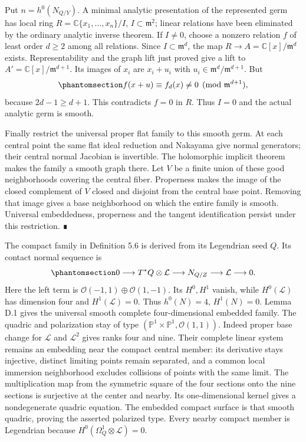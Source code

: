 \documentclass[
  english,
  11pt,
  reqno]{amsart}
\begin{document}
Put \(n=h^0(N_{Q/Y})\). A minimal analytic presentation of the
represented germ has local ring \(R=\mathbb C\{x_1,\ldots,x_n\}/I\),
\(I\subset\mathfrak m^2\); linear relations have been eliminated by the
ordinary analytic inverse theorem. If \(I\ne0\), choose a nonzero
relation \(f\) of least order \(d\ge2\) among all relations. Since
\(I\subset\mathfrak m^d\), the map \(R\to A=\mathbb C[x]/\mathfrak m^d\)
exists. Representability and the graph lift just proved give a lift to
\(A'=\mathbb C[x]/\mathfrak m^{d+1}\). Its images of \(x_i\) are
\(x_i+u_i\) with \(u_i\in\mathfrak m^d/\mathfrak m^{d+1}\). But
\begin{equation}\protect\phantomsection\label{eq:gg-compact-support-least-relation}{
 f(x+u)\equiv f_d(x)\not=0
                  \pmod{\mathfrak m^{d+1}},
}\end{equation} because \(2d-1\ge d+1\). This contradicts \(f=0\) in
\(R\). Thus \(I=0\) and the actual analytic germ is smooth.

Finally restrict the universal proper flat family to this smooth germ.
At each central point the same flat ideal reduction and Nakayama give
normal generators; their central normal Jacobian is invertible. The
holomorphic implicit theorem makes the family a smooth graph there. Let
\(V\) be a finite union of these good neighborhoods covering the central
fiber. Properness makes the image of the closed complement of \(V\)
closed and disjoint from the central base point. Removing that image
gives a base neighborhood on which the entire family is smooth.
Universal embeddedness, properness and the tangent identification
persist under this restriction. ∎

The compact family in Definition 5.6 is derived from its Legendrian seed
\(Q\). Its contact normal sequence is
\begin{equation}\protect\phantomsection\label{eq:gg-contact-sky-normal}{
 0\longrightarrow T^*Q\otimes\mathcal L
   \longrightarrow N_{Q/Z}\longrightarrow\mathcal L\longrightarrow0 .
}\end{equation} Here the left term is
\(\mathcal O(-1,1)\oplus\mathcal O(1,-1)\). Its \(H^0,H^1\) vanish,
while \(H^0(\mathcal L)\) has dimension four and \(H^1(\mathcal L)=0\).
Thus \(h^0(N)=4\), \(H^1(N)=0\). Lemma D.1 gives the universal smooth
complete four-dimensional embedded family. The quadric and polarization
stay of type \((\mathbb P^1\times\mathbb P^1,\mathcal O(1,1))\). Indeed
proper base change for \(\mathcal L\) and \(\mathcal L^2\) gives ranks
four and nine. Their complete linear system remains an embedding near
the compact central member: its derivative stays injective, distinct
limiting points remain separated, and a common local immersion
neighborhood excludes collisions of points with the same limit. The
multiplication map from the symmetric square of the four sections onto
the nine sections is surjective at the center and nearby. Its
one-dimensional kernel gives a nondegenerate quadric equation. The
embedded compact surface is that smooth quadric, proving the asserted
polarized type. Every nearby compact member is Legendrian because
\(H^0(\Omega_Q^1\otimes\mathcal L)=0\).
\end{document}
